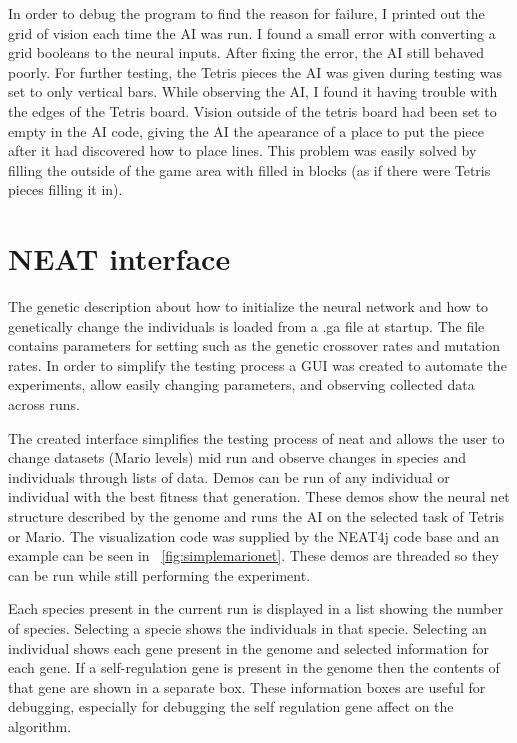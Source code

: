 \documentclass[12pt]{ucthesis} \newif\ifpdf \ifx\pdfoutput\undefined
\begin{document}
In order to debug the program to find the reason for failure, I printed out the
grid of vision each time the AI was run. I found a small error with converting a
grid booleans to the neural inputs. After fixing the error, the AI still behaved
poorly. For further testing, the Tetris pieces the AI was given during testing
was set to only vertical bars. While observing the AI, I found it having trouble
with the edges of the Tetris board. Vision outside of the tetris board had been
set to empty in the AI code, giving the AI the apearance of a place to put the
piece after it had discovered how to place lines. This problem was easily solved
by filling the outside of the game area with filled in blocks (as if there were
Tetris pieces filling it in).

\section{NEAT interface}

The genetic description about how to initialize the neural network and how to
genetically change the individuals is loaded from a .ga file at startup. The
file contains parameters for setting such as the genetic crossover rates and
mutation rates. In order to simplify the testing process a GUI was created to
automate the experiments, allow easily changing parameters, and observing
collected data across runs.

The created interface simplifies the testing process of neat and allows the user
to change datasets (Mario levels) mid run and observe changes in species and
individuals through lists of data. Demos can be run of any individual or
individual with the best fitness that generation. These demos show the neural
net structure described by the genome and runs the AI on the selected task of
Tetris or Mario. The visualization code was supplied by the NEAT4j code base
and an example can be seen in ~\ref{fig:simplemarionet}.
These demos are threaded so they can be run while still performing the
experiment.

Each species present in the current run is displayed in a list showing the
number of species. Selecting a specie shows the individuals in that specie.
Selecting an individual shows each gene present in the genome and selected
information for each gene. If a self-regulation gene is present in the genome
then the contents of that gene are shown in a separate box. These information
boxes are useful for debugging, especially for debugging the self regulation
gene affect on the algorithm.
\end{document}
